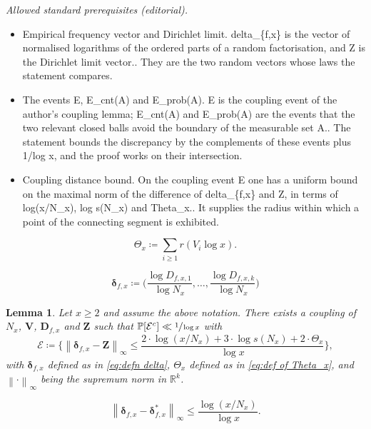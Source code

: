 \documentclass[10pt,a4paper]{article}
\newcommand{\bD}{{\boldsymbol D}}
\newcommand{\bV}{{\boldsymbol V}}
\newcommand{\bZ}{{\boldsymbol Z}}
\newcommand{\RR}{\mathbb{R}}
\newcommand{\PP}{\mathbb{P}}
\newcommand{\bolddelta}{\boldsymbol{\delta}}
\newcommand{\maxnorm}[1]{\left\| #1 \right\|_{\infty}}
\newcommand{\bgg}{\Big}
\theoremstyle{plain}
\newtheorem{lem}[cor]{Lemma}
\theoremstyle{definition}
\begin{document}
\noindent\textit{Allowed standard prerequisites (editorial).}\begin{itemize}
\item Empirical frequency vector and Dirichlet limit. delta\_\{f,x\} is the vector of normalised logarithms of the ordered parts of a random factorisation, and Z is the Dirichlet limit vector.. They are the two random vectors whose laws the statement compares.
\item The events E, E\_cnt(A) and E\_prob(A). E is the coupling event of the author's coupling lemma; E\_cnt(A) and E\_prob(A) are the events that the two relevant closed balls avoid the boundary of the measurable set A.. The statement bounds the discrepancy by the complements of these events plus 1/log x, and the proof works on their intersection.
\item Coupling distance bound. On the coupling event E one has a uniform bound on the maximal norm of the difference of delta\_\{f,x\} and Z, in terms of log(x/N\_x), log s(N\_x) and Theta\_x.. It supplies the radius within which a point of the connecting segment is exhibited.
\end{itemize}\medskip
\begin{equation}
\label{eq:def of Theta_x}
\Theta_x \coloneqq \sum_{i \ge 1} r(V_i\log x).
\end{equation}

\begin{equation}
\label{eq:defn delta}
\bolddelta_{f, x} \coloneqq \bgg(\frac{\log D_{f,x,1}}{\log N_x},\dots,\frac{\log D_{f,x,k}}{\log N_x}\bgg)
\end{equation}

\begin{lem}
\label{lem:coupling for factorizations}
Let $x\ge2$ and assume the above notation. There exists a coupling of $N_x$, $\bV$, $\bD_{f, x}$ and $\bZ$ such that $\PP[\mathcal E^c] \ll \sfrac{1}{\log x}$ with
\[
\mathcal E \coloneqq \bgg\{\maxnorm{\bolddelta_{f, x} - \bZ} \le \frac{2 \cdot \log(x/N_x) + 3 \cdot \log s(N_x) + 2\cdot \Theta_x}{\log x}\bgg\},
\]
with $\bolddelta_{f, x}$ defined as in \eqref{eq:defn delta}, $\Theta_x$ defined as in \eqref{eq:def of Theta_x}, and $\maxnorm \cdot$ being the supremum norm in $\RR^k$.
\end{lem}

\begin{equation}
\label{eq:transition delta to delta*}
\maxnorm{ \bolddelta_{f, x} - \bolddelta_{f, x}^*} \le \frac{\log(x/N_x)}{\log x}.
\end{equation}
\end{document}
